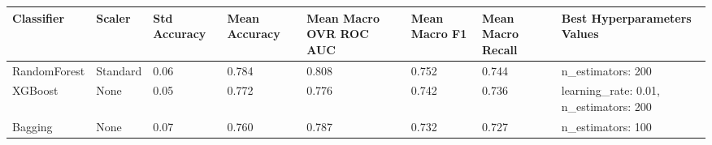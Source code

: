 \begin{tabular}{llllllll}
\toprule
Classifier & Scaler & Std Accuracy & Mean Accuracy & Mean Macro OVR ROC AUC & Mean Macro F1 & Mean Macro Recall & Best Hyperparameters Values \\
\midrule
RandomForest & Standard & 0.06 & 0.784 & 0.808 & 0.752 & 0.744 & {{n\_estimators: 200}} \\
XGBoost & None & 0.05 & 0.772 & 0.776 & 0.742 & 0.736 & {{learning\_rate: 0.01,  n\_estimators: 200}} \\
Bagging & None & 0.07 & 0.760 & 0.787 & 0.732 & 0.727 & {{n\_estimators: 100}} \\
\bottomrule
\end{tabular}
